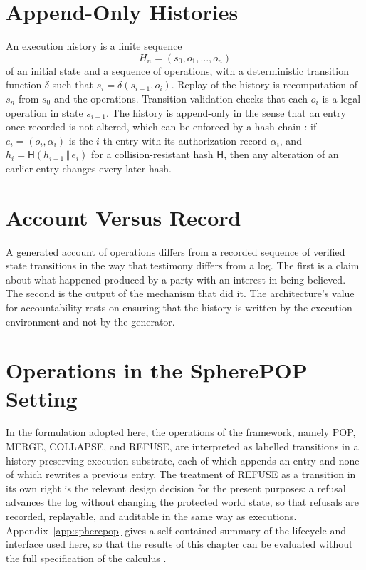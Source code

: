 \section{Append-Only Histories}

An execution history is a finite sequence
\[
H_n=(s_0,o_1,\dots,o_n)
\]
of an initial state and a sequence of operations, with a deterministic transition function $\delta$ such that $s_i=\delta(s_{i-1},o_i)$. Replay of the history is recomputation of $s_n$ from $s_0$ and the operations. Transition validation checks that each $o_i$ is a legal operation in state $s_{i-1}$. The history is append-only in the sense that an entry once recorded is not altered, which can be enforced by a hash chain \cite{lamport1981}: if $e_i=(o_i,\alpha_i)$ is the $i$-th entry with its authorization record $\alpha_i$, and $h_i=\mathsf{H}(h_{i-1}\,\Vert\,e_i)$ for a collision-resistant hash $\mathsf H$, then any alteration of an earlier entry changes every later hash.

\section{Account Versus Record}

A generated account of operations differs from a recorded sequence of verified state transitions in the way that testimony differs from a log. The first is a claim about what happened produced by a party with an interest in being believed. The second is the output of the mechanism that did it. The architecture's value for accountability rests on ensuring that the history is written by the execution environment and not by the generator.

\section{Operations in the SpherePOP Setting}

In the formulation adopted here, the operations of the \sph{} framework, namely POP, MERGE, COLLAPSE, and REFUSE, are interpreted as labelled transitions in a history-preserving execution substrate, each of which appends an entry and none of which rewrites a previous entry. The treatment of REFUSE as a transition in its own right is the relevant design decision for the present purposes: a refusal advances the log without changing the protected world state, so that refusals are recorded, replayable, and auditable in the same way as executions. Appendix~\ref{app:spherepop} gives a self-contained summary of the lifecycle and interface used here, so that the results of this chapter can be evaluated without the full specification of the calculus \cite{flyxion2026b}.

